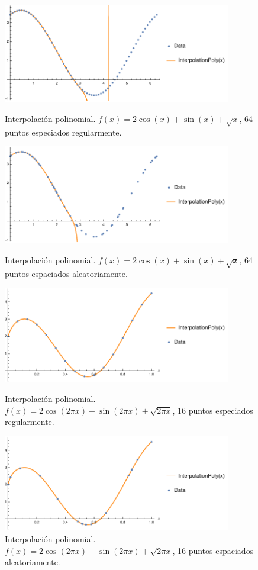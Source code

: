 \documentclass[11pt,letterpaper]{article}
\begin{document}
\begin{figure}
\centering
\includegraphics[width=10cm]{img/5.pdf}
\caption{Interpolación polinomial. $f(x)=2\cos (x)+\sin (x)+\sqrt{x}$, 64 puntos especiados regularmente.}
\includegraphics[width=10cm]{img/6.pdf}
\caption{Interpolación polinomial. $f(x)=2\cos (x)+\sin (x)+\sqrt{x}$, 64 puntos espaciados aleatoriamente.}
\includegraphics[width=10cm]{img/7.pdf}
\caption{Interpolación polinomial. $f(x)=2\cos (2\pi x)+\sin (2\pi x)+\sqrt{2\pi x}$, 16 puntos especiados regularmente.}
\includegraphics[width=10cm]{img/8.pdf}
\caption{Interpolación polinomial. $f(x)=2\cos (2\pi x)+\sin (2\pi x)+\sqrt{2\pi x}$, 16 puntos espaciados aleatoriamente.}
\end{figure}
\end{document}
